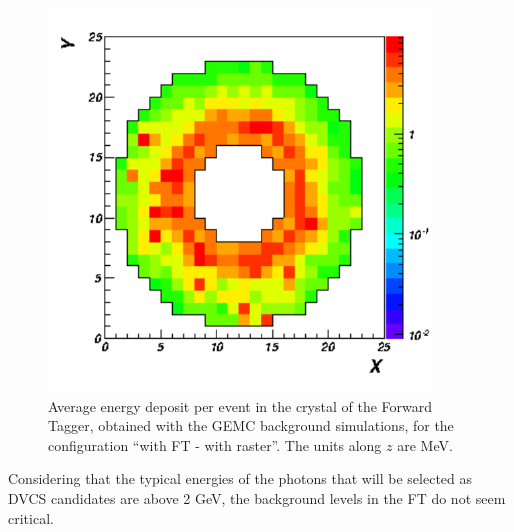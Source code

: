 \begin{figure}[htbp] 
   \centering
   \includegraphics[width=4in]{ft_time.pdf} 
   \caption{Average energy deposit per event in the crystal of the Forward Tagger, obtained with the GEMC background simulations, for the configuration ``with FT - with raster''. The units along $z$ are MeV. }
   \label{ft_time}
\end{figure}
Considering that the typical energies of the photons that will be selected as DVCS candidates are above 2 GeV, the background levels in the FT do not seem critical. 

